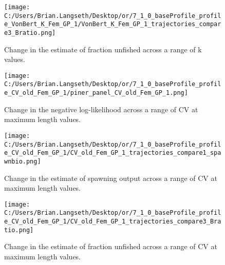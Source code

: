 \documentclass[11pt,
  english,
  a4paper,
]{article}
\begin{document}
\tagmcend\tagstructend


\begin{figure}
\centering
\texttt{[image: C:/Users/Brian.Langseth/Desktop/or/7\_1\_0\_baseProfile\_profile\_VonBert\_K\_Fem\_GP\_1/VonBert\_K\_Fem\_GP\_1\_trajectories\_compare3\_Bratio.png]}
\caption{Change in the estimate of fraction unfished across a range of k values.\label{fig:k-depl}}
\end{figure}

\tagmcend\tagstructend


\begin{figure}
\centering
\texttt{[image: C:/Users/Brian.Langseth/Desktop/or/7\_1\_0\_baseProfile\_profile\_CV\_old\_Fem\_GP\_1/piner\_panel\_CV\_old\_Fem\_GP\_1.png]}
\caption{Change in the negative log-likelihood across a range of CV at maximum length values.\label{fig:cv2-profile}}
\end{figure}

\tagmcend\tagstructend


\begin{figure}
\centering
\texttt{[image: C:/Users/Brian.Langseth/Desktop/or/7\_1\_0\_baseProfile\_profile\_CV\_old\_Fem\_GP\_1/CV\_old\_Fem\_GP\_1\_trajectories\_compare1\_spawnbio.png]}
\caption{Change in the estimate of spawning output across a range of CV at maximum length values.\label{fig:cv2-ssb}}
\end{figure}

\tagmcend\tagstructend


\begin{figure}
\centering
\texttt{[image: C:/Users/Brian.Langseth/Desktop/or/7\_1\_0\_baseProfile\_profile\_CV\_old\_Fem\_GP\_1/CV\_old\_Fem\_GP\_1\_trajectories\_compare3\_Bratio.png]}
\caption{Change in the estimate of fraction unfished across a range of CV at maximum length values.\label{fig:cv2-depl}}
\end{figure}
\end{document}
